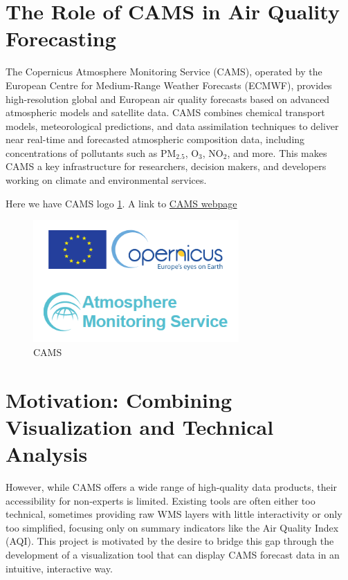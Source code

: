 \section{The Role of CAMS in Air Quality Forecasting}

The Copernicus Atmosphere Monitoring Service (CAMS), operated by the European Centre for Medium-Range Weather Forecasts (ECMWF), provides high-resolution global and European air quality forecasts based on advanced atmospheric models and satellite data. CAMS combines chemical transport models, meteorological predictions, and data assimilation techniques to deliver near real-time and forecasted atmospheric composition data, including concentrations of pollutants such as PM$_{2.5}$, O$_3$, NO$_2$, and more. This makes CAMS a key infrastructure for researchers, decision makers, and developers working on climate and environmental services.

Here we have CAMS logo \ref{fig:ej2}. A link to  \href{https://atmosphere.copernicus.eu/}{CAMS webpage}%


\begin{figure} [h!btp]
	\centering
	\includegraphics[width=0.7\textwidth]{fig/copernicus-image.png}
	\caption[CAMS]{CAMS\footnotemark}
	\label{fig:ej2}
\end{figure}

\section{Motivation: Combining Visualization and Technical Analysis}

However, while CAMS offers a wide range of high-quality data products, their accessibility for non-experts is limited. Existing tools are often either too technical, sometimes providing raw WMS layers with little interactivity or only too simplified, focusing only on summary indicators like the Air Quality Index (AQI). This project is motivated by the desire to bridge this gap through the development of a visualization tool that can display CAMS forecast data in an intuitive, interactive way. 

